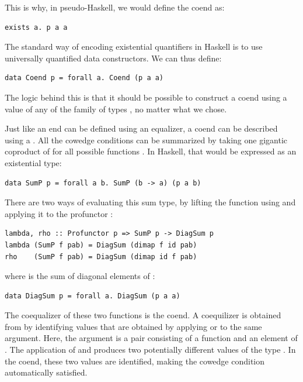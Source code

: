 This is why, in pseudo-Haskell, we would define the coend as:

\begin{Verbatim}[commandchars=\\\{\}]
exists a. p a a
\end{Verbatim}
The standard way of encoding existential quantifiers in Haskell is to
use universally quantified data constructors. We can thus define:

\begin{Verbatim}[commandchars=\\\{\}]
data Coend p = forall a. Coend (p a a)
\end{Verbatim}
The logic behind this is that it should be possible to construct a coend
using a value of any of the family of types , no matter
what  we chose.

Just like an end can be defined using an equalizer, a coend can be
described using a . All the cowedge conditions can be
summarized by taking one gigantic coproduct of  for all
possible functions . In Haskell, that would be
expressed as an existential type:

\begin{Verbatim}[commandchars=\\\{\}]
data SumP p = forall a b. SumP (b -> a) (p a b)
\end{Verbatim}
There are two ways of evaluating this sum type, by lifting the function
using  and applying it to the profunctor :

\begin{Verbatim}[commandchars=\\\{\}]
lambda, rho :: Profunctor p => SumP p -> DiagSum p
lambda (SumP f pab) = DiagSum (dimap f id pab)
rho    (SumP f pab) = DiagSum (dimap id f pab)
\end{Verbatim}
where  is the sum of diagonal elements of :

\begin{Verbatim}[commandchars=\\\{\}]
data DiagSum p = forall a. DiagSum (p a a)
\end{Verbatim}
The coequalizer of these two functions is the coend. A coequilizer is
obtained from  by identifying values that are
obtained by applying  or  to the same
argument. Here, the argument is a pair consisting of a function
 and an element of . The
application of  and  produces two potentially
different values of the type . In the coend, these
two values are identified, making the cowedge condition automatically
satisfied.

